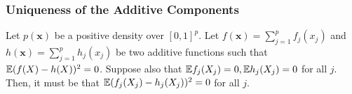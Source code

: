 


\subsubsection{Uniqueness of the Additive Components}
 
\begin{lemma}
\label{lem:additive_uniqueness}
Let $p(\mathbf{x})$ be a positive density over $[0,1]^p$. Let $f(\mathbf{x}) = \sum_{j=1}^p f_j(x_j)$ and $h(\mathbf{x}) = \sum_{j=1}^p h_j(x_j)$ be two additive functions such that ${\mathbb E}( f(X) - h(X) )^2 = 0$. Suppose also that ${\mathbb E} f_j(X_j) = 0, {\mathbb E} h_j(X_j) = 0$ for all $j$. Then, it must be that ${\mathbb E}( f_j(X_j) - h_j(X_j))^2 = 0$ for all $j$.
\end{lemma}

